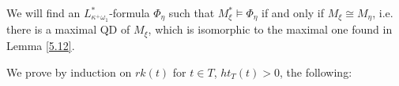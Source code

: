 \documentclass[12pt,a4paper]{amsart}
\theoremstyle{definition}
\theoremstyle{remark}
\begin{document}

We will find an $L^*_{\kappa^+\omega_1}$-formula $\Phi_\eta$ such that $M^*_\xi\models \Phi_\eta$ if and only if $M_\xi\cong M_\eta$, i.e. there is a maximal QD of $M_\xi$, which is isomorphic to the maximal one found in Lemma \ref{5.12}.

We prove by induction on $rk(t)$ for $t\in T$, $ht_T(t)>0$, the following:
\end{document}
